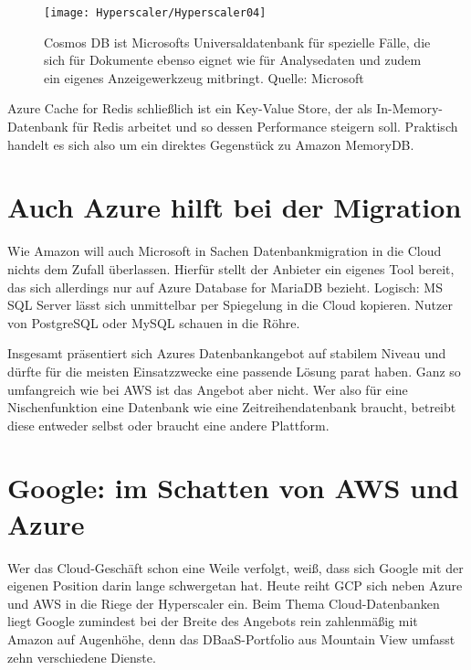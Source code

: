 \begin{figure}
	
	\begin{center}
		
		\texttt{[image: Hyperscaler/Hyperscaler04]}
		
		\caption[Cosmos DB]{Cosmos DB ist Microsofts Universaldatenbank für spezielle Fälle, die sich für Dokumente ebenso eignet wie für Analysedaten und zudem ein eigenes Anzeigewerkzeug mitbringt. Quelle: Microsoft}
	\end{center} 
\end{figure}

Azure Cache for Redis schließlich ist ein Key-Value Store, der als In-Memory-Datenbank für Redis arbeitet und so dessen Performance steigern soll. Praktisch handelt es sich also um ein direktes Gegenstück zu Amazon MemoryDB.

\section{Auch Azure hilft bei der Migration}

Wie Amazon will auch Microsoft in Sachen Datenbankmigration in die Cloud nichts dem Zufall überlassen. Hierfür stellt der Anbieter ein eigenes Tool bereit, das sich allerdings nur auf Azure Database for MariaDB bezieht. Logisch: MS SQL Server lässt sich unmittelbar per Spiegelung in die Cloud kopieren. Nutzer von PostgreSQL oder MySQL schauen in die Röhre.

Insgesamt präsentiert sich Azures Datenbankangebot auf stabilem Niveau und dürfte für die meisten Einsatzzwecke eine passende Lösung parat haben. Ganz so umfangreich wie bei AWS ist das Angebot aber nicht. Wer also für eine Nischenfunktion eine Datenbank wie eine Zeitreihendatenbank braucht, betreibt diese entweder selbst oder braucht eine andere Plattform.

\section{Google: im Schatten von AWS und Azure}

Wer das Cloud-Geschäft schon eine Weile verfolgt, weiß, dass sich Google mit der eigenen Position darin lange schwergetan hat. Heute reiht GCP sich neben Azure und AWS in die Riege der Hyperscaler ein. Beim Thema Cloud-Datenbanken liegt Google zumindest bei der Breite des Angebots rein zahlenmäßig mit Amazon auf Augenhöhe, denn das DBaaS-Portfolio aus Mountain View umfasst zehn verschiedene Dienste.

